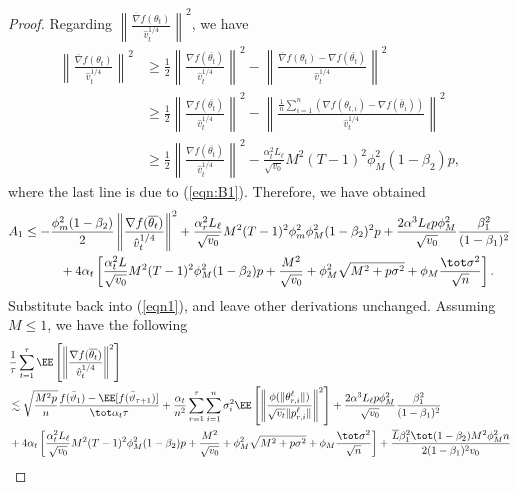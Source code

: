 \documentclass[nohyperref]{article}
\begin{document}
\begin{proof}
Regarding $\left\| \frac{\overline{\nabla}f(\theta_t)}{\hat v_t^{1/4}} \right\|^2$, we have
\begin{align*}
\left\| \frac{\overline{\nabla}f(\theta_t)}{\hat v_t^{1/4}} \right\|^2 & \geq \frac{1}{2} \left\| \frac{\nabla f(\overline{\theta_t})}{\hat v_t^{1/4}} \right\|^2 - \left\| \frac{\overline{\nabla}f(\theta_t)- \nabla f(\overline{\theta_t})}{\hat v_t^{1/4}} \right\|^2\\
& \geq \frac{1}{2} \left\| \frac{\nabla f(\overline{\theta_t})}{\hat v_t^{1/4}} \right\|^2 - \left\| \frac{\frac{1}{n}\sum_{i=1}^n (\nabla f(\theta_{t,i})-\nabla f(\bar\theta_i))}{\hat v_t^{1/4}} \right\|^2 \\
&\geq \frac{1}{2} \left\| \frac{\nabla f(\overline{\theta_t})}{\hat v_t^{1/4}} \right\|^2 - \frac{\alpha_t^2 L_\ell}{\sqrt{v_0}} M^2 (T-1)^2 \phi_M^2 (1-\beta_2)p,
\end{align*}
where the last line is due to (\ref{eqn:B1}). Therefore, we have obtained
\begin{align*}
    A_1&\leq -\frac{\phi_m^2(1-\beta_2)}{2}\left\| \frac{\nabla f(\overline{\theta_t})}{\hat v_t^{1/4}} \right\|^2+\frac{\alpha_r^2 L_\ell}{\sqrt{v_0}} M^2 (T-1)^2 \phi_m^2\phi_M^2 (1-\beta_2)^2p+\frac{2\alpha^3 L_\ell p\phi_M^2}{ \sqrt{v_0}}\frac{\beta_1^2}{(1-\beta_1)^2} \\
    &\hspace{0.4in}  + 4\alpha_t \left[ \frac{\alpha_t^2 L}{\sqrt{v_0}}  M^2 (T-1)^2 \phi_M^2 (1-\beta_2)p + \frac{M^2}{\sqrt{v_0}}+\phi_M^2\sqrt{M^2+p\sigma^2} + \phi_M \frac{\tot \sigma^2}{\sqrt{n}}\right].
\end{align*}
Substitute back into (\ref{eqn1}), and leave other derivations unchanged. Assuming $M\leq 1$, we have the following
\begin{align*}
    &\frac{1}{\tau}\sum_{t=1}^\tau  \EE\left[ \left\| \frac{\nabla f(\overline{\theta_t})}{\hat v_t^{1/4}}   \right \|^2 \right] \\
    & \lesssim  \sqrt{\frac{M^2 p}{n}} \frac{ f(\bar{\vartheta}_1)  - \EE[ f(\bar{\vartheta}_{\tau+1})]}{\tot \alpha_t \tau}+   \frac{\alpha_t}{n^2}  \sum_{r=1}^\tau  \sum_{i = 1}^n  \sigma_i^2 \EE\left[ \left\|\frac{\phi(\|\theta_{r,i}^{\ell}\|)}{\sqrt{v_t} \|p_{r,i}^{\ell}\|} \right\|^2 \right] +\frac{2\alpha^3 L_\ell p\phi_M^2}{ \sqrt{v_0}}\frac{\beta_1^2}{(1-\beta_1)^2} \nonumber\\
   &   +4\alpha_t \left[ \frac{\alpha_t^2 L_\ell}{\sqrt{v_0}}  M^2 (T-1)^2 \phi_M^2 (1-\beta_2)p + \frac{M^2}{\sqrt{v_0}}+\phi_M^2\sqrt{M^2+p\sigma^2} + \phi_M \frac{\tot \sigma^2}{\sqrt{n}}\right] + \frac{ \overline{L}\beta_1^2\tot(1-\beta_2)M^2 \phi^2_M n}{2(1-\beta_1)^2 v_0}   \nonumber \\

\end{align*}
\end{proof}
\end{document}
